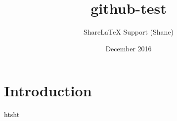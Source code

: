\documentclass{article}
\title{github-test}
\author{ShareLaTeX Support (Shane)}
\date{December 2016}
\begin{document}
\maketitle

\section{Introduction}



htsht
\end{document}
